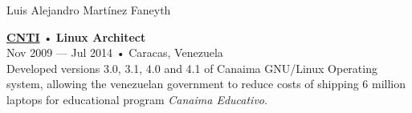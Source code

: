 \documentclass[12pt]{article}
\begin{document}
\begin{cv}{Luis Alejandro Mart\'inez Faneyth}
\begin{minipage}[t]{0.55\textwidth}
    \parbox[t]{\linewidth}{
      \textbf{\href{https://www.cnti.gob.ve}{CNTI}} • \textrm{\textbf{Linux Architect}}\\
      Nov 2009 --- Jul 2014 • Caracas, Venezuela\\
      \footnotesize{Developed versions 3.0, 3.1, 4.0 and 4.1 of Canaima GNU/Linux Operating system, allowing the venezuelan government to reduce costs of shipping 6 million laptops for educational program \textsl{Canaima Educativo}.}\\
    }
  \end{minipage}

\end{cv}
\end{document}

